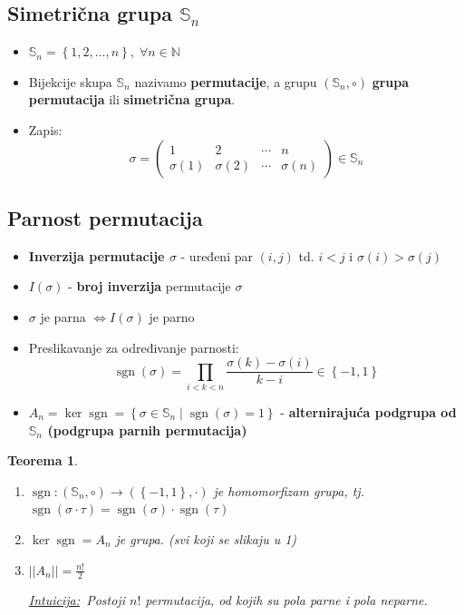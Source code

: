\documentclass[a4paper,12pt,twoside]{report}
\newtheorem{theorem}{Teorema}[section]
\numberwithin{algorithm}{section}
\newcommand{\intuicija}{\noindent\underline{\textit{Intuicija:}}\ }
\begin{document}
\subsection{Simetrična grupa $\mathbb{S}_n$}
\begin{itemize}
    \item $\mathbb{S}_n = \left\{1, 2, \dots, n\right\}, \;\forall n \in \mathbb{N}$
    \item Bijekcije skupa $\mathbb{S}_n$ nazivamo \textbf{permutacije}, a grupu $(\mathbb{S}_n, \circ)$ \textbf{grupa permutacija} ili \textbf{simetrična grupa}.
    \item Zapis: \[
\sigma = \begin{pmatrix} 
1 & 2 & \cdots & n \\ 
\sigma(1) & \sigma(2) & \cdots & \sigma(n) 
\end{pmatrix} \in \mathbb{S}_n\]
\end{itemize}

\subsection{Parnost permutacija}
\label{ParnostPermutacija}
\begin{itemize}
    \item \textbf{Inverzija permutacije $\sigma$} - uređeni par $(i, j)$ td. $i < j$ i $\sigma(i) > \sigma(j)$
    \item $I(\sigma)$ - \textbf{broj inverzija} permutacije $\sigma$
    \item $\sigma$ je parna $\iff I(\sigma)$ je parno
    \item Preslikavanje za određivanje parnosti: \[ \operatorname{sgn}(\sigma) = \prod_{i < k < n} \frac{\sigma(k) - \sigma(i)}{k - i} \in \left\{-1, 1\right\} \]
    \item $A_n = \ker \operatorname{sgn} = \left\{\sigma \in \mathbb{S}_n \; | \; \operatorname{sgn}(\sigma) = 1\right\}$ - \textbf{alternirajuća podgrupa od $\mathbb{S}_n$ (podgrupa parnih permutacija)} 
\end{itemize}

\begin{theorem}\
    \begin{enumerate}
        \item $\operatorname{sgn}: (\mathbb{S}_n, \circ) \to (\left\{-1, 1\right\}, \cdot)$ je homomorfizam grupa, tj. $ \operatorname{sgn}(\sigma \cdot \tau) = \operatorname{sgn}(\sigma) \cdot \operatorname{sgn}(\tau) $
        \item $\ker \operatorname{sgn} = A_n$ je grupa. \;\; (svi koji se slikaju u 1)
        \item $||A_n|| = \frac{n!}{2}$
        
        \intuicija Postoji $n!$ permutacija, od kojih su pola parne i pola neparne.
    \end{enumerate}
\end{theorem}
\end{document}
